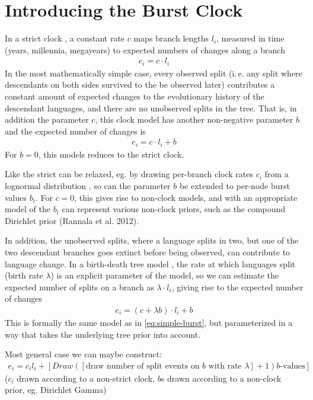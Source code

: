 \documentclass[a4paper,12pt]{scrartcl}
\begin{document}
\section{Introducing the Burst Clock}
\label{sec:description}
In a strict clock \parencite{}, a constant rate $c$ maps branch lengths $l_i$,
measured in time (years, millennia, megayears) to expected numbers of changes
along a branch
\begin{align}
  e_i = c \cdot l_i
  \label{eq:strict}
\end{align}
In the most mathematically simple case,
every observed split (i.\,e. any split where descendants on both sides survived
to the be observed later) contributes a constant amount of expected changes to
the evolutionary history of the descendant languages, and there are no
unobserved splits in the tree.
That is, in addition the parameter $c$, this clock model has another
non-negative parameter $b$ and the expected number of changes is 
\begin{align}
  e_i = c \cdot l_i + b
  \label{eq:simple-burst}
\end{align}
For $b=0$, this models reduces to the strict clock.

Like the strict can be relaxed, eg. by drawing per-branch clock rates $c_i$ from
a lognormal distribution \parencite{}, so can the parameter $b$ be extended to
per-node burst values $b_i$. For $c=0$, this gives rise to non-clock models, and
with an appropriate model of the $b_i$ can represent various non-clock priors,
such as the compound Dirichlet prior (Rannala et al. 2012).

In addition, the unobserved splits, where a language splits in two, but one of
the two descendant branches goes extinct before being observed, can contribute
to language change. In a birth-death tree model \parencite{}, the rate at which
languages split (birth rate $\lambda$) is an explicit parameter of the model, so
we can estimate the expected number of splits on a branch as $\lambda \cdot
l_i$, giving rise to the expected number of changes
\begin{align}
  e_i = (c + \lambda b) \cdot l_i + b
  \label{eq:reparam-burst}
\end{align}
This is formally the same model as in \cref{eq:simple-burst}, but parameterized
in a way that takes the underlying tree prior into account.

Most general case we can maybe construct:
\begin{align}
  e_i = c_i l_i + \left[Draw \left( [\text{draw number of split events on }b\text{ with rate } \lambda] + 1 \right) b\text{-values}\right]
  \label{eq:reparam-burst}
\end{align}
($c_i$ drawn according to a non-strict clock, $b$s drawn according to a non-clock prior, eg. Dirichlet Gamma)
\end{document}
